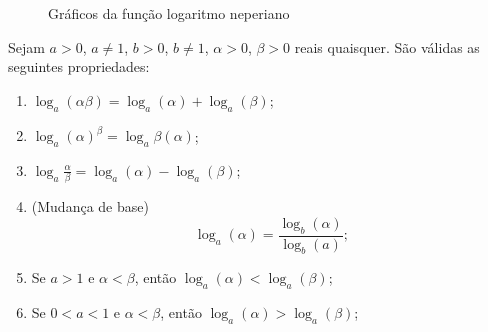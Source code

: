   \begin{figure}[H]
 \centering
    \caption{Gráficos da função logaritmo neperiano}
  \end{figure}

  Sejam $a> 0$, $a \neq 1$, $b> 0$, $b \neq 1$, $\alpha > 0$, $\beta > 0$ reais quaisquer. São válidas as seguintes propriedades:
  \begin{enumerate}
   \item $\log_{a}(\alpha\beta)=\log_{a}(\alpha) + \log_{a}(\beta)$;
   \item $\log_{a}(\alpha)^{\beta}=\log_{a}\beta(\alpha)$;
   \item $\log_{a}\frac{\alpha}{\beta}=\log_{a}(\alpha) - \log_{a}(\beta)$;
   \item (Mudança de base) \[\log_{a}(\alpha)=\frac{\log_{b}(\alpha)}{\log_{b}(a)};\]
   \item Se $a> 1$ e $\alpha < \beta$, então $\log_{a}(\alpha) < \log_{a}(\beta)$;
   \item Se $0 < a < 1$ e $\alpha < \beta$, então $\log_{a}(\alpha) > \log_{a}(\beta)$;
  \end{enumerate}

 \newpage
